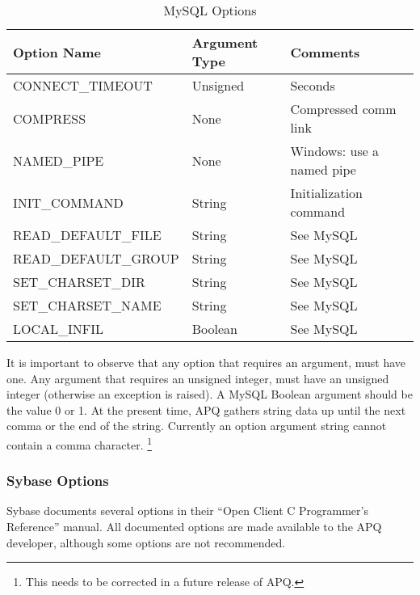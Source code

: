 \documentclass[english,letterpaper]{book}
\begin{document}
\begin{table}
   \begin{center}
      \begin{tabular}{lll}
         Option Name          &  Argument Type           &  Comments\\
         \hline 
         CONNECT\_TIMEOUT     &  Unsigned                &  Seconds\\
         COMPRESS             &  None                    &  Compressed comm link\\
         NAMED\_PIPE          &  None                    &  Windows: use a named pipe\\
         INIT\_COMMAND        &  String                  &  Initialization command\\
         READ\_DEFAULT\_FILE  &  String                  &  See MySQL\\
         READ\_DEFAULT\_GROUP &  String                  &  See MySQL\\
         SET\_CHARSET\_DIR    &  String                  &  See MySQL\\
         SET\_CHARSET\_NAME   &  String                  &  See MySQL\\
         LOCAL\_INFIL         &  Boolean                 &  See MySQL\\
      \end{tabular}
   \end{center}
   \caption{MySQL Options}\label{t:myopts}
\end{table}

It is important to observe that any option that requires an argument,
must have one. Any argument that requires an unsigned integer, must
have an unsigned integer (otherwise an exception is raised). A MySQL
Boolean argument should be the value 0 or 1. At the present time,
APQ gathers string data up until the next comma or the end of the
string. Currently an option argument string cannot contain a comma
character.
\footnote{This needs to be corrected in a future release of APQ.}


\subsubsection{Sybase Options}

Sybase documents several options in their ``Open Client C Programmer's
Reference'' manual. All documented options are made available to
the APQ developer, although some options are not recommended. 
\end{document}
